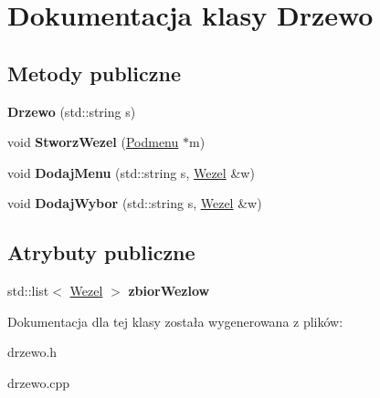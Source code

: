 \hypertarget{classDrzewo}{\section{Dokumentacja klasy Drzewo}
\label{classDrzewo}
}
\subsection*{Metody publiczne}
\begin{DoxyCompactItemize}
\item 
\hypertarget{classDrzewo_a7604da7404204071a75a4bac923ef049}{{\bfseries Drzewo} (std\-::string s)}\label{classDrzewo_a7604da7404204071a75a4bac923ef049}

\item 
\hypertarget{classDrzewo_a44c5d315178bc4c6cde1f81e8bfd9f7e}{void {\bfseries Stworz\-Wezel} (\hyperlink{classPodmenu}{Podmenu} $\ast$m)}\label{classDrzewo_a44c5d315178bc4c6cde1f81e8bfd9f7e}

\item 
\hypertarget{classDrzewo_aeb0307413bf7d531808839d05d55fb3a}{void {\bfseries Dodaj\-Menu} (std\-::string s, \hyperlink{classWezel}{Wezel} \&w)}\label{classDrzewo_aeb0307413bf7d531808839d05d55fb3a}

\item 
\hypertarget{classDrzewo_a088d99d1c4daf6ccddcd38fe3428d45d}{void {\bfseries Dodaj\-Wybor} (std\-::string s, \hyperlink{classWezel}{Wezel} \&w)}\label{classDrzewo_a088d99d1c4daf6ccddcd38fe3428d45d}

\end{DoxyCompactItemize}
\subsection*{Atrybuty publiczne}
\begin{DoxyCompactItemize}
\item 
\hypertarget{classDrzewo_a735300a8e9673c5a7a7ee880d140c065}{std\-::list$<$ \hyperlink{classWezel}{Wezel} $>$ {\bfseries zbior\-Wezlow}}\label{classDrzewo_a735300a8e9673c5a7a7ee880d140c065}

\end{DoxyCompactItemize}


Dokumentacja dla tej klasy została wygenerowana z plików\-:\begin{DoxyCompactItemize}
\item 
drzewo.\-h\item 
drzewo.\-cpp\end{DoxyCompactItemize}
